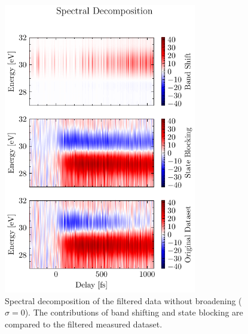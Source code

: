 \begin{figure}
	\centering
	\includegraphics[width=0.75\textwidth]{figures/chap4/spectral_decomp1.pdf}
	\caption{Spectral decomposition of the filtered data without broadening ($\sigma=0$). The contributions of band shifting and state blocking are compared to the filtered measured dataset.}
	\label{fig:spectral_decomp1}
\end{figure}


